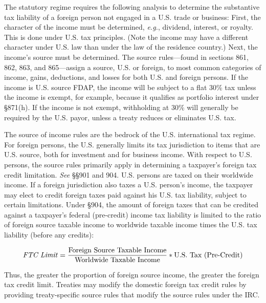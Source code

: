 The statutory regime requires the following analysis to determine the substantive tax liability of a foreign person not engaged in a U.S. trade or business:  First, the character of the income must be determined, \emph{e.g.}, dividend, interest, or royalty.  This is done under U.S. tax principles.  (Note the income may have a different character under U.S. law than under the law of the residence country.)   Next, the income's source must be determined.  The source rules---found in sections 861, 862, 863, and 865---assign a source, U.S. or foreign, to most common categories of income, gains, deductions, and losses for both U.S. and foreign persons.  If the income is U.S. source FDAP, the income will be subject to a flat 30\% tax unless the income is exempt, for example, because it qualifies as portfolio interest under \S 871(h).  If the income is not exempt, withholding at 30\% will generally be required by the U.S. payor, unless a treaty reduces or eliminates U.S. tax. 

The source of income rules are the bedrock of the U.S. international tax regime.  For foreign persons, the U.S. generally limits its tax jurisdiction to items that are U.S. source, both for investment and for business income.  With respect to U.S. persons, the source rules primarily apply in determining a taxpayer's foreign tax credit limitation. \emph{See} \S\S 901 and 904.  U.S. persons are taxed on their worldwide income.  If a foreign jurisdiction also taxes a U.S. person's income, the taxpayer may elect to credit foreign taxes paid against his U.S. tax liability, subject to certain limitations.  Under \S 904, the amount of foreign taxes that can be credited against a taxpayer's federal (pre-credit) income tax liability is limited to the ratio of foreign source taxable income to worldwide taxable income times the U.S. tax liability (before any credits):  

\begin{center}
\begin{framed}
\begin{equation*}
\text{\emph{FTC  Limit}} = \frac{\text{Foreign Source Taxable Income}}{\text{Worldwide Taxable Income}} * \text{U.S. Tax (Pre-Credit)}
\end{equation*}
\end{framed}
\end{center}

Thus, the greater the proportion of foreign source income, the greater the foreign tax credit limit.  Treaties may modify the domestic foreign tax credit rules by providing treaty-specific source rules that modify the source rules under the IRC.

